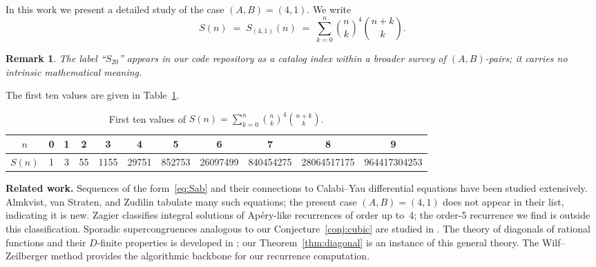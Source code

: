 \documentclass[11pt, a4paper]{article}
\newtheorem{remark}[theorem]{Remark}
\begin{document}
In this work we present a detailed study of the case $(A,B)=(4,1)$.  We write
\begin{equation}\label{eq:S20def}
  S(n) \;=\; S_{(4,1)}(n)
        \;=\; \sum_{k=0}^n \binom{n}{k}^4 \binom{n+k}{k}.
\end{equation}

\begin{remark}
The label ``$S_{20}$'' appears in our code repository as a catalog index
within a broader survey of $(A,B)$-pairs; it carries no intrinsic mathematical
meaning.
\end{remark}

The first ten values are given in Table~\ref{tab:s20}.
\begin{table}[ht]
    \centering
    \begin{tabular}{@{}ccccccccccc@{}}
        \toprule
        $n$ & 0 & 1 & 2 & 3 & 4 & 5 & 6 & 7 & 8 & 9 \\
        \midrule
        $S(n)$ & 1 & 3 & 55 & 1155 & 29751 & 852753 & 26097499 &
                  840454275 & 28064517175 & 964417304253 \\
        \bottomrule
    \end{tabular}
    \caption{First ten values of $S(n)=\sum_{k=0}^n\binom{n}{k}^4\binom{n+k}{k}$.}
    \label{tab:s20}
\end{table}

\medskip\noindent
\textbf{Related work.}
Sequences of the form~\eqref{eq:Sab} and their connections to Calabi--Yau
differential equations have been studied extensively.  Almkvist, van Straten,
and Zudilin \cite{Almkvist2005} tabulate many such equations; the present case
$(A,B)=(4,1)$ does not appear in their list, indicating it is new.  Zagier
\cite{Zagier2009} classifies integral solutions of Ap\'ery-like recurrences of
order up to~4; the order-5 recurrence we find is outside this classification.
Sporadic supercongruences analogous to our Conjecture~\ref{conj:cubic} are
studied in \cite{Osburn2016,Straub2014}.  The theory of diagonals of rational
functions and their $D$-finite properties is developed in
\cite{LipshitzPoorten1990}; our Theorem~\ref{thm:diagonal} is an instance of
this general theory.  The Wilf--Zeilberger method \cite{PetkovsekWilfZeilberger1996}
provides the algorithmic backbone for our recurrence computation.
\end{document}
